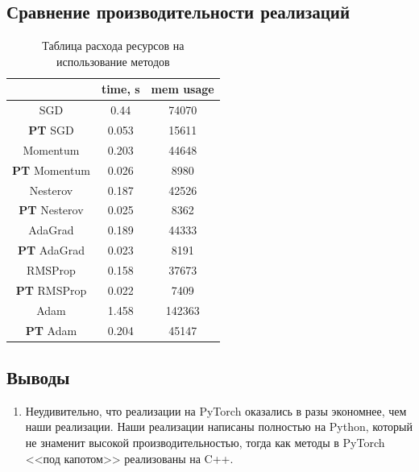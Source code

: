 \documentclass[a4paper,14pt,oneside,openany]{memoir}
\begin{document}
\subsection{Сравнение производительности реализаций}
\FloatBarrier
\begin{table}
	\centering
	\begin{tabular}{|c|c|c| }
	\hline
	& time, s & mem usage \\
	\hline
	SGD & 0.44 & 74070 \\
	\hline
	\textbf{PT} SGD & 0.053 & 15611 \\
	\hline
	Momentum & 0.203 & 44648  \\
	\hline
	\textbf{PT} Momentum & 0.026 & 8980  \\
	\hline
	Nesterov & 0.187 & 42526  \\ 
	\hline
	\textbf{PT} Nesterov & 0.025 & 8362  \\ 
	\hline
	AdaGrad & 0.189 & 44333 \\
	\hline
	\textbf{PT} AdaGrad & 0.023 & 8191   \\ 
	\hline
	RMSProp & 0.158 & 37673  \\
	\hline
	\textbf{PT} RMSProp & 0.022 & 7409  \\ 
	\hline
	Adam & 1.458 & 142363  \\
	\hline
	\textbf{PT} Adam & 0.204 & 45147  \\ 
	\hline
	\end{tabular}
	\caption{Таблица расхода ресурсов на использование методов}
\end{table}

\clearpage

\subsection{Выводы}
\begin{enumerate}
\item Неудивительно, что реализации на PyTorch оказались в разы экономнее, чем наши реализации. Наши реализации написаны полностью на Python, который не знаменит высокой производительностью, тогда как методы в PyTorch <<под капотом>> реализованы на C++.
\end{enumerate}
\newpage
	
\end{document}
